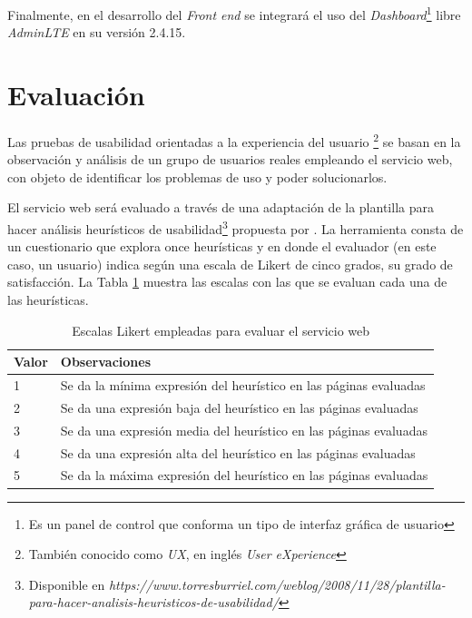 Finalmente, en el desarrollo del \emph{Front end} se integrar\'a el uso del \emph{Dashboard}\footnote{Es un panel de control que conforma un tipo de interfaz gr\'afica de usuario} libre \emph{AdminLTE} en su versi\'on 2.4.15.

\section{Evaluaci\'on}

Las pruebas de usabilidad orientadas a la experiencia del usuario \footnote{Tambi\'en conocido como \emph{UX}, en ingl\'es \emph{User eXperience}} se basan en la observaci\'on y an\'alisis de un grupo de usuarios reales empleando el servicio web, con objeto de identificar los problemas de uso y poder solucionarlos.\newline

El servicio web ser\'a evaluado a trav\'es de una adaptaci\'on de la plantilla para hacer an\'alisis heur\'isticos de usabilidad\footnote{Disponible en \emph{https://www.torresburriel.com/weblog/2008/11/28/plantilla-para-hacer-analisis-heuristicos-de-usabilidad/}} propuesta por \cite{OnceHeuristicas}. La herramienta consta de un cuestionario que explora once heur\'isticas y en donde el evaluador (en este caso, un usuario) indica seg\'un una escala de Likert de cinco grados, su grado de satisfacci\'on. La Tabla \ref{tablaEscalasLikert} muestra las escalas con las que se evaluan cada una de las heur\'isticas.\newline

\begin{table}[htbp]
    \begin{center}
    \caption{Escalas Likert empleadas para evaluar el servicio web}
    \begin{tabular}{| p{1.5cm}| p{11cm} |}
    \hline
    \centering \textbf{Valor } & \textbf{Observaciones} \\
    \hline \hline
    1 & Se da la m\'inima expresi\'on del heur\'istico en las p\'aginas evaluadas \\ \hline
    2 & Se da una expresi\'on baja del heur\'istico en las p\'aginas evaluadas \\ \hline
    3 & Se da una expresi\'on media del heur\'istico en las p\'aginas evaluadas \\ \hline
    4 & Se da una expresi\'on alta del heur\'istico en las p\'aginas evaluadas \\ \hline
    5 & Se da la m\'axima expresi\'on del heur\'istico en las p\'aginas evaluadas \\ \hline
    \end{tabular}
    \label{tablaEscalasLikert}
    \end{center}
\end{table}

